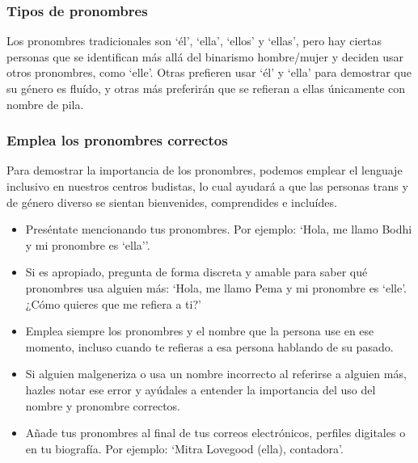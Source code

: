 \documentclass[12pt,openany]{book}
\begin{document}
\subsubsection*{Tipos de pronombres}

Los pronombres tradicionales son `él', `ella', `ellos' y `ellas', pero hay ciertas personas que se identifican más allá del binarismo hombre/mujer y deciden usar otros pronombres, como `elle'. Otras prefieren usar `él' y `ella' para demostrar que su género es fluído, y otras más preferirán que se refieran a ellas únicamente con nombre de pila.

\subsubsection*{Emplea los pronombres correctos}

Para demostrar la importancia de los pronombres, podemos emplear el lenguaje inclusivo en nuestros centros budistas, lo cual ayudará a que las personas trans y de género diverso se sientan bienvenides, comprendides e incluídes.

\begin{itemize}
\setlength\itemsep{-0.3em}
\item Preséntate mencionando tus pronombres. Por ejemplo: `Hola, me llamo Bodhi y mi pronombre es `ella''.
\item Si es apropiado, pregunta de forma discreta y amable para saber qué pronombres usa alguien más: `Hola, me llamo Pema y mi pronombre es `elle'. ¿Cómo quieres que me refiera a ti?'
\item Emplea siempre los pronombres y el nombre que la persona use en ese momento, incluso cuando te refieras a esa persona hablando de su pasado.
\item Si alguien malgeneriza o usa un nombre incorrecto al referirse a alguien más, hazles notar ese error y ayúdales a entender la importancia del uso del nombre y pronombre correctos.
\item Añade tus pronombres al final de tus correos electrónicos, perfiles digitales o en tu biografía. Por ejemplo: `Mitra Lovegood (ella), contadora'.
\end{itemize}\begin{figure}[h]
    \centering
\end{figure}
\end{document}
